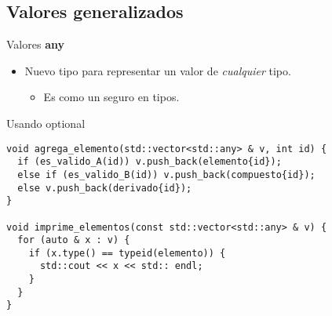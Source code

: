\subsection{Valores generalizados}

\begin{frame}[t,fragile]{Valores \textbf{any}}
\begin{itemize}
  \item Nuevo tipo  para representar un valor de \emph{cualquier} tipo.
    \begin{itemize}
      \item Es como un  seguro en tipos.
    \end{itemize}
\end{itemize}
\begin{block}{Usando optional}
\begin{lstlisting}
void agrega_elemento(std::vector<std::any> & v, int id) {
  if (es_valido_A(id)) v.push_back(elemento{id});
  else if (es_valido_B(id)) v.push_back(compuesto{id});
  else v.push_back(derivado{id});
}

void imprime_elementos(const std::vector<std::any> & v) {
  for (auto & x : v) {
    if (x.type() == typeid(elemento)) {
      std::cout << x << std:: endl;
    }
  }
}
\end{lstlisting}
\end{block}
\end{frame}

